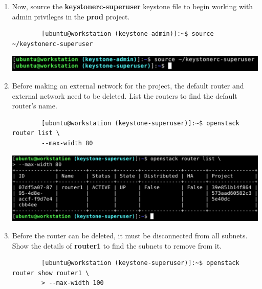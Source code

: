\documentclass[letterpaper, 12pt]{article}
\begin{document}
\begin{enumerate}
    \item Now, source the \textbf{keystonerc-superuser} keystone file to begin working with admin privileges in the
    \textbf{prod} project.
    \begin{lstlisting}
        [ubuntu@workstation (keystone-admin)]:~$ source ~/keystonerc-superuser
    \end{lstlisting}

    \begin{center}
        \includegraphics[width=\linewidth]{images/part1/step13.png}
    \end{center}

    \item Before making an external network for the project, the default router and external network need to be deleted.
    List the routers to find the default router's name.
    \begin{lstlisting}
        [ubuntu@workstation (keystone-superuser)]:~$ openstack router list \
        --max-width 80
    \end{lstlisting}

    \begin{center}
        \includegraphics[width=\linewidth]{images/part1/step14.png}
    \end{center}

    \item Before the router can be deleted, it must be disconnected from all subnets. Show the details of
    \textbf{router1} to find the subnets to remove from it.

    \begin{lstlisting}
        [ubuntu@workstation (keystone-superuser)]:~$ openstack router show router1 \
        > --max-width 100
    \end{lstlisting}


\end{enumerate}
\end{document}

